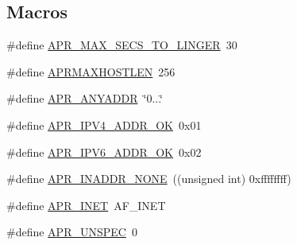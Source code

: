 \subsection*{Macros}
\begin{DoxyCompactItemize}
\item 
\#define \mbox{\hyperlink{group__apr__network__io_ga8311c84f6946742188a6b9a45e92ea8e}{A\+P\+R\+\_\+\+M\+A\+X\+\_\+\+S\+E\+C\+S\+\_\+\+T\+O\+\_\+\+L\+I\+N\+G\+ER}}~30
\item 
\#define \mbox{\hyperlink{group__apr__network__io_ga7f5b3882209106bb407b1d518d6ad59d}{A\+P\+R\+M\+A\+X\+H\+O\+S\+T\+L\+EN}}~256
\item 
\#define \mbox{\hyperlink{group__apr__network__io_gadce1131c46b897ec63e9e4316a4631dd}{A\+P\+R\+\_\+\+A\+N\+Y\+A\+D\+DR}}~\char`\"{}0...\char`\"{}
\item 
\#define \mbox{\hyperlink{group__apr__network__io_ga58aa30a94127b4a80f27fbf2e03fdfd8}{A\+P\+R\+\_\+\+I\+P\+V4\+\_\+\+A\+D\+D\+R\+\_\+\+OK}}~0x01
\item 
\#define \mbox{\hyperlink{group__apr__network__io_gaef1f70f9b969d25832a230f429837207}{A\+P\+R\+\_\+\+I\+P\+V6\+\_\+\+A\+D\+D\+R\+\_\+\+OK}}~0x02
\item 
\#define \mbox{\hyperlink{group__apr__network__io_ga16eb7ee55ff87a5093f2114ea5351217}{A\+P\+R\+\_\+\+I\+N\+A\+D\+D\+R\+\_\+\+N\+O\+NE}}~((unsigned int) 0xffffffff)
\item 
\#define \mbox{\hyperlink{group__apr__network__io_gaa96e8e8dbf92bc77643a4032017b3d67}{A\+P\+R\+\_\+\+I\+N\+ET}}~A\+F\+\_\+\+I\+N\+ET
\item 
\#define \mbox{\hyperlink{group__apr__network__io_gaa7a33b17a7d0820b09ef489bd3328f85}{A\+P\+R\+\_\+\+U\+N\+S\+P\+EC}}~0
\end{DoxyCompactItemize}
